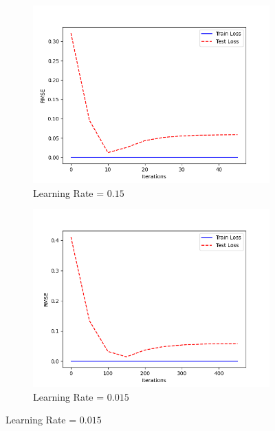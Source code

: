 \documentclass[a4paper, utf8]{ctexart}
\begin{document}
	\begin{figure}[htbp]
		\centering
		\begin{subfigure}{.48\textwidth}
			\centering
			\includegraphics[width=.9\linewidth]{./figure/1(b)1.png}
			\caption{Learning Rate = $0.15$}
		\end{subfigure}
		\begin{subfigure}{.48\textwidth}
			\centering
			\includegraphics[width=.9\linewidth]{./figure/1(b)2.png}
			\caption{Learning Rate = $0.015$}
		\end{subfigure}
		

\end{figure}
\end{document}
